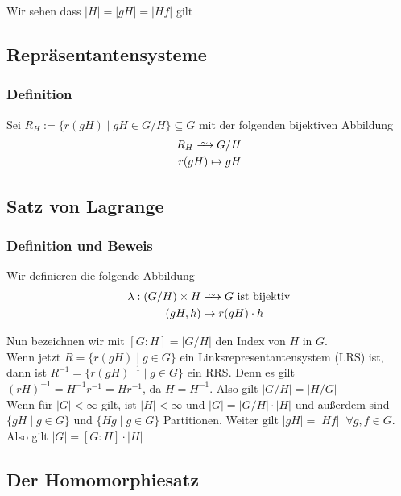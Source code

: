\documentclass[12pt, german]{article}
\newcommand\iso{\xrightarrow{
		\,\smash{\raisebox{-0.65ex}{\ensuremath{\scriptstyle\sim}}}\,}}
\begin{document}
	Wir sehen dass $|H|=|gH| = |Hf|$ gilt
	
	\subsection{Repräsentantensysteme}		
	\subsubsection{Definition}
	Sei $R_H := \{r(gH) \mid gH \in G/H\} \subseteq G$ mit der folgenden bijektiven  Abbildung
	\begin{align*}
		R_H \iso G/H \\
		r(gH) \mapsto gH 
	\end{align*}
	
	\subsection{Satz von Lagrange}		
	\subsubsection{Definition und Beweis}
	Wir definieren die folgende Abbildung
	\begin{align*}
		\lambda: (G/H) \times H &\iso G \text{ ist bijektiv} \\
		(gH, h) &\mapsto r(gH) \cdot h
	\end{align*}
	
	Nun bezeichnen wir mit $[G:H] = |G/H|$ den Index von $H$ in $G$. \\ 
	Wenn jetzt $R = \{r(gH) \mid g \in G \}$ ein Linksrepresentantensystem (LRS) ist, \\ 
	dann ist $R^{-1} = \{r(gH)^{-1} \mid g \in G \}$ ein RRS. 
	Denn es gilt $(rH)^{-1} = H^{-1}r^{-1} = Hr^{-1}$, da $H=H^{-1}$.
	Also gilt $|G/H| = |H/G|$ \\
	
	Wenn für $|G| < \infty $ gilt, ist $|H| < \infty $ und $|G| = |G/H| \cdot |H|$ und 
	außerdem sind $\{gH \mid g \in G \}$ und $\{Hg \mid g \in G \}$ Partitionen. Weiter gilt $|gH| = |Hf| \;\;\forall g,f \in G$. \\
	Also gilt $|G| = [G:H] \cdot |H|$ 
	
	
	\subsection{Der Homomorphiesatz}		
\end{document}
